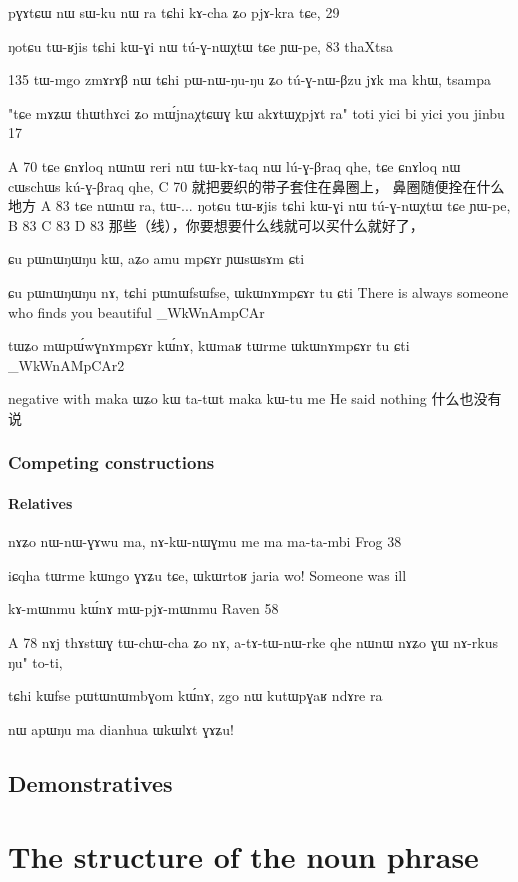 \documentclass[oldfontcommands,oneside,a4paper,11pt]{memoir}
\newcommand{\ipa}[1]{{\phon #1}} %
\newcommand{\wav}[1]{}%
\begin{document}
pɣɤtɕɯ	nɯ	sɯ-ku	nɯ	ra	tɕhi	kɤ-cha	ʑo	pjɤ-kra	tɕe,
29

ŋotɕu	tɯ-ʁjis	tɕhi	kɯ-ɣi	nɯ	tú-ɣ-nɯχtɯ	tɕe	ɲɯ-pe,
83 thaXtsa

135	tɯ-mgo	zmɤrɤβ	nɯ	tɕhi	pɯ-nɯ-ŋu-ŋu	ʑo	tú-ɣ-nɯ-βzu	jɤk	ma	khɯ,
tsampa


"tɕe mɤʑɯ thɯthɤci ʑo mɯ́jnaχtɕɯɣ kɯ akɤtɯχpjɤt ra" toti
yici bi yici you jinbu 17


A	70	tɕe	ɕnɤloq	nɯnɯ	reri	nɯ	tɯ-kɤ-taq	nɯ	lú-ɣ-βraq	qhe,	tɕe	ɕnɤloq	nɯ	cɯschɯs	kú-ɣ-βraq	qhe,
C	70	就把要织的带子套住在鼻圈上， 鼻圈随便拴在什么地方
A	83	tɕe	nɯnɯ	ra,	tɯ-...	ŋotɕu	tɯ-ʁjis	tɕhi	kɯ-ɣi	nɯ	tú-ɣ-nɯχtɯ	tɕe	ɲɯ-pe,
B	83
C	83
D	83	那些（线），你要想要什么线就可以买什么就好了，

ɕu pɯnɯŋɯŋu kɯ, aʑo amu mpɕɤr ɲɯsɯsɤm ɕti

ɕu pɯnɯŋɯŋu nɤ, tɕhi pɯnɯfsɯfse, ɯkɯnɤmpɕɤr tu ɕti
There is always someone who finds you beautiful
\ipa{8_WkWnAmpCAr}

tɯʑo mɯpɯ́wɣnɤmpɕɤr kɯ́nɤ, kɯmaʁ tɯrme ɯkɯnɤmpɕɤr tu ɕti
\ipa{8_WkWnAMpCAr2}



negative with maka
ɯʑo kɯ ta-tɯt maka kɯ-tu me
He said nothing 什么也没有说
\subsection{Competing constructions}

\subsubsection{Relatives}
nɤʑo	nɯ-nɯ-ɣɤwu	ma,	nɤ-kɯ-nɯɣmu	me	ma	ma-ta-mbi
Frog 38


iɕqha tɯrme kɯngo ɣɤʑu tɕe, ɯkɯrtoʁ jaria wo!
Someone was ill \wav{8_kWngoGAZu}


	kɤ-mɯnmu	kɯ́nɤ	mɯ-pjɤ-mɯnmu				
	Raven 58


A	78	nɤj	thɤstɯɣ	tɯ-chɯ-cha	ʑo	nɤ,	a-tɤ-tɯ-nɯ-rke	qhe	nɯnɯ	nɤʑo	ɣɯ	nɤ-rkus	ŋu"	to-ti,


tɕhi kɯfse pɯtɯnɯmbɣom kɯ́nɤ, zgo nɯ kutɯpɣaʁ ndɤre ra
\wav{8_kutWnWmbGom}

nɯ apɯŋu ma dianhua ɯkɯlɤt ɣɤʑu!
\wav{WkWlAt}

\section{Demonstratives} \label{sec:demonstratives}
\chapter{The structure of the noun phrase} \label{chapt:noun.phrase}
\end{document}
